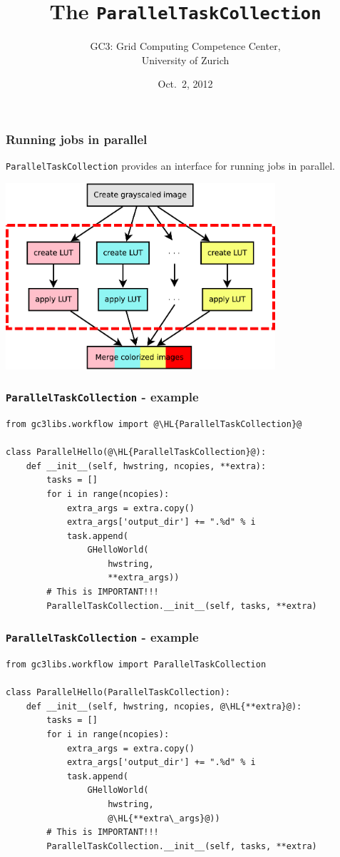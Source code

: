 \documentclass[english,serif,mathserif,xcolor=pdftex,dvipsnames,table]{beamer}
\title{%
  The \texttt{ParallelTaskCollection}
}
\author[Antonio Messina]{%
  GC3: Grid Computing Competence Center, \\
  University of Zurich
}
\date{Oct.~2, 2012}
\begin{document}
\maketitle


\begin{frame}[fragile]
  \frametitle{Running jobs in parallel}

  \texttt{ParallelTaskCollection} provides an interface for
  running jobs in parallel.
  
  \+
  \begin{center}
    \includegraphics[width=0.75\textwidth]{fig/warholize-wkf2}
  \end{center}
\end{frame}


\begin{frame}[fragile]
  \frametitle{\texttt{ParallelTaskCollection} - example}
  \begin{lstlisting}[basicstyle=\tt\scriptsize]
from gc3libs.workflow import @\HL{ParallelTaskCollection}@

class ParallelHello(@\HL{ParallelTaskCollection}@):
    def __init__(self, hwstring, ncopies, **extra):
        tasks = []
        for i in range(ncopies):
            extra_args = extra.copy()
            extra_args['output_dir'] += ".%d" % i
            task.append(
                GHelloWorld(
                    hwstring,
                    **extra_args))
        # This is IMPORTANT!!!
        ParallelTaskCollection.__init__(self, tasks, **extra)
  \end{lstlisting}
\end{frame}



\begin{frame}[fragile]
  \frametitle{\texttt{ParallelTaskCollection} - example}
  \begin{lstlisting}[basicstyle=\tt\scriptsize]
from gc3libs.workflow import ParallelTaskCollection

class ParallelHello(ParallelTaskCollection):
    def __init__(self, hwstring, ncopies, @\HL{**extra}@):
        tasks = []
        for i in range(ncopies):
            extra_args = extra.copy()
            extra_args['output_dir'] += ".%d" % i
            task.append(
                GHelloWorld(
                    hwstring,
                    @\HL{**extra\_args}@))
        # This is IMPORTANT!!!
        ParallelTaskCollection.__init__(self, tasks, **extra)
  \end{lstlisting}
\end{frame}
\end{document}
